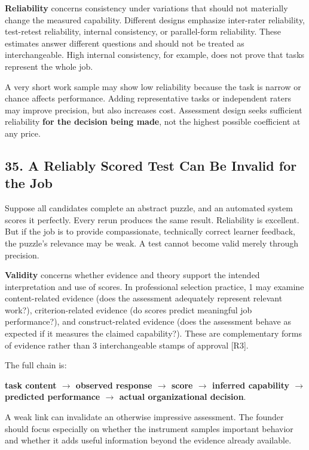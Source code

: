 \textbf{Reliability} concerns consistency under variations that should not materially change the measured capability. Different designs emphasize inter-rater reliability, test-retest reliability, internal consistency, or parallel-form reliability. These estimates answer different questions and should not be treated as interchangeable. High internal consistency, for example, does not prove that tasks represent the whole job.

A very short work sample may show low reliability because the task is narrow or chance affects performance. Adding representative tasks or independent raters may improve precision, but also increases cost. Assessment design seeks sufficient reliability \textbf{for the decision being made}, not the highest possible coefficient at any price.

\subsection*{35. A Reliably Scored Test Can Be Invalid for the Job}

Suppose all candidates complete an abstract puzzle, and an automated system scores it perfectly. Every rerun produces the same result. Reliability is excellent. But if the job is to provide compassionate, technically correct learner feedback, the puzzle's relevance may be weak. A test cannot become valid merely through precision.

\textbf{Validity} concerns whether evidence and theory support the intended interpretation and use of scores. In professional selection practice, 1 may examine content-related evidence (does the assessment adequately represent relevant work?), criterion-related evidence (do scores predict meaningful job performance?), and construct-related evidence (does the assessment behave as expected if it measures the claimed capability?). These are complementary forms of evidence rather than 3 interchangeable stamps of approval [R3].

The full chain is:
\begin{center}
\textbf{task content $\to$ observed response $\to$ score $\to$ inferred capability $\to$ predicted performance $\to$ actual organizational decision}.
\end{center}
A weak link can invalidate an otherwise impressive assessment. The founder should focus especially on whether the instrument samples important behavior and whether it adds useful information beyond the evidence already available.

